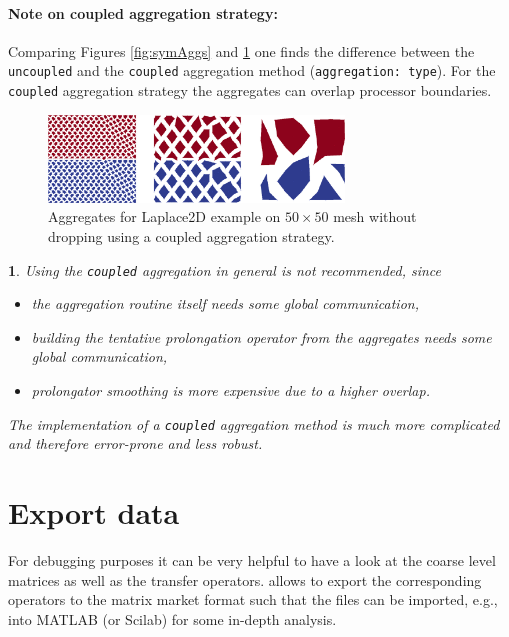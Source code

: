 \documentclass[10pt,fleqn]{book}
\newtheorem*{mycomment}{\ding{42}}
\begin{document}
\paragraph{Note on coupled aggregation strategy:}
Comparing Figures \ref{fig:symAggs} and \ref{fig:nonsymAggsCoupled} one finds the difference between the \verb|uncoupled| and the \verb|coupled| aggregation method (\texttt{aggregation: type}). For the \verb|coupled| aggregation strategy the aggregates can overlap processor boundaries.
\begin{figure}
\centering
\includegraphics[width=0.7\textwidth]{pics/aggsSymmCoupled.png}
\caption{Aggregates for Laplace2D example on $50\times 50$ mesh without dropping using a coupled aggregation strategy.}
\label{fig:nonsymAggsCoupled}
\end{figure}

\begin{mycomment}
Using the \verb|coupled| aggregation in general is not recommended, since
\begin{itemize}
\item[-] the aggregation routine itself needs some global communication,
\item[-] building the tentative prolongation operator from the aggregates needs some global communication,
\item[-] prolongator smoothing is more expensive due to a higher overlap.
\end{itemize}
The implementation of a \verb|coupled| aggregation method is much more complicated and therefore error-prone and less robust.
\end{mycomment}



\section{Export data}
\label{sec:exportdatasimple}
For debugging purposes it can be very helpful to have a look at the coarse level matrices as well as the transfer operators. \muelu allows to export the corresponding operators to the matrix market format such that the files can be imported, e.g., into MATLAB (or Scilab) for some in-depth analysis.
\end{document}
